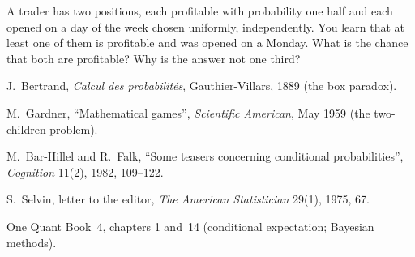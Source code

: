\begin{interviewq}\label{iq:iv:probability-i:14}
A trader has two positions, each profitable with probability one half and each opened on a day of the week
chosen uniformly, independently. You learn that at least one of them is profitable and was opened on a Monday.
What is the chance that both are profitable? Why is the answer not one third?
\end{interviewq}

\begin{omsources}
\item J.~Bertrand, \emph{Calcul des probabilit\'es}, Gauthier-Villars, 1889 (the box paradox).
\item M.~Gardner, ``Mathematical games'', \emph{Scientific American}, May 1959 (the two-children problem).
\item M.~Bar-Hillel and R.~Falk, ``Some teasers concerning conditional probabilities'', \emph{Cognition} 11(2),
1982, 109--122.
\item S.~Selvin, letter to the editor, \emph{The American Statistician} 29(1), 1975, 67.
\item One Quant Book~4, chapters 1 and~14 (conditional expectation; Bayesian methods).
\end{omsources}
